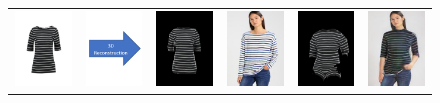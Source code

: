 

\begin{figure}[t]
   \centering
\begin{tabular}{cccccc}

\includegraphics[width=2cm]{figures/c2dw/000008_1.png}&
\includegraphics[width=2cm]{figures/arrow_recon.png}&
\includegraphics[width=2cm]{figures/c3drecon/000008_1_000303_0.png}&
\includegraphics[width=2cm]{figures/image/000303_0.jpg}&
\includegraphics[width=2cm]{figures/c3dwfull/000008_1_000303_0.png}&
\includegraphics[width=2cm]{figures/try-on/000008_1_000303_0.jpg}\\


\end{tabular}
\end{figure}
